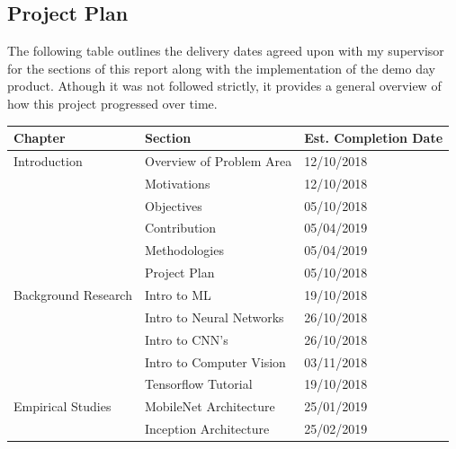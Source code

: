 \documentclass[12pt]{report}
\begin{document}
\printbibliography
\begin{appendices}
\chapter{Project Plan}
\begin{flushleft}
The following table outlines the delivery dates agreed upon with my supervisor for the sections of this report along with the implementation of the demo day product. Athough it was not followed strictly, it provides a general overview of how this project progressed over time.
\end{flushleft}

\begin{table}[ht!]
\begin{tabular}{|l|l|l|}
\hline
Chapter                   & Section                  & Est. Completion Date \\ \hline
Introduction              & Overview of Problem Area & 12/10/2018           \\ \hline
                          & Motivations              & 12/10/2018           \\ \hline
                          & Objectives               & 05/10/2018           \\ \hline
                          & Contribution             & 05/04/2019           \\ \hline
                          & Methodologies            & 05/04/2019           \\ \hline
                          & Project Plan             & 05/10/2018           \\ \hline
Background Research       & Intro to ML              & 19/10/2018           \\ \hline
                          & Intro to Neural Networks & 26/10/2018           \\ \hline
                          & Intro to CNN's           & 26/10/2018           \\ \hline
                          & Intro to Computer Vision & 03/11/2018           \\ \hline
                          & Tensorflow Tutorial      & 19/10/2018           \\ \hline          
Empirical Studies         & MobileNet Architecture   & 25/01/2019           \\ \hline
                          & Inception Architecture   & 25/02/2019           \\ \hline                   

\end{tabular}
\end{table}
\end{appendices}
\end{document}
